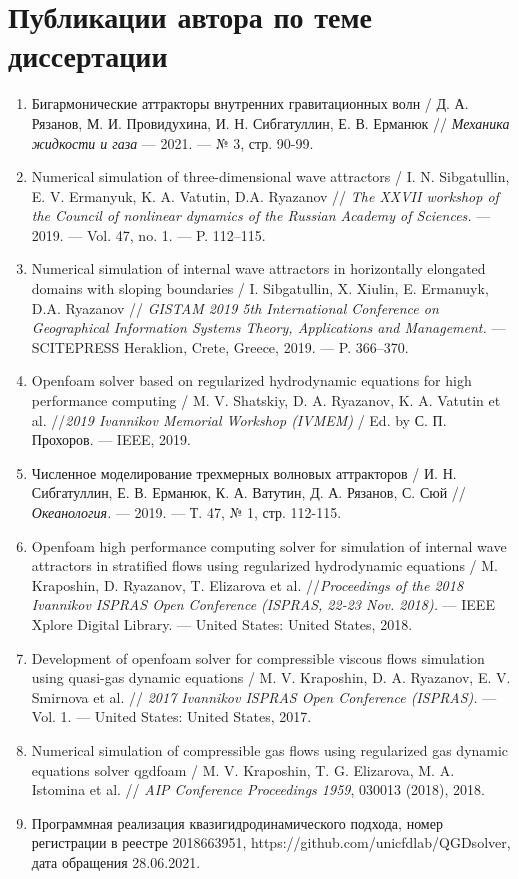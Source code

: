 \documentclass[utf8x]{G7-32} %
\newcommand\blfootnote[1]{%
  \begingroup
  \renewcommand\thefootnote{}\footnote{#1}%
  \addtocounter{footnote}{-1}%
  \endgroup
}
\begin{document}
\section*{Публикации автора по теме диссертации}
\footnotesize{
\begin{enumerate}[1.]
  \item Бигармонические аттракторы внутренних гравитационных волн / Д. А. Рязанов, М. И. Провидухина, И. Н. Сибгатуллин, Е. В. Ерманюк // \textit{Механика жидкости и газа}  — 2021. — № 3, стр. 90-99. 
  \item Numerical simulation of three-dimensional wave attractors / I. N. Sibgatullin, E. V. Ermanyuk, K. A. Vatutin, D.A. Ryazanov // \textit{The XXVII workshop of the Council of nonlinear dynamics of the Russian Academy of Sciences.} — 2019. — Vol. 47, no. 1. — P. 112–115.
  \item Numerical simulation of internal wave attractors in horizontally elongated domains with sloping boundaries / I. Sibgatullin, X. Xiulin, E. Ermanuyk, D.A. Ryazanov // \textit{GISTAM 2019 5th International Conference on Geographical Information Systems Theory, Applications and Management.} — SCITEPRESS Heraklion, Crete, Greece, 2019. — P. 366–370.
  \item Openfoam solver based on regularized hydrodynamic equations for high performance computing / M. V. Shatskiy, D. A. Ryazanov, K. A. Vatutin et al. //\textit{2019 Ivannikov Memorial Workshop (IVMEM)} / Ed. by С. П. Прохоров. — IEEE, 2019.
  \item  Численное моделирование трехмерных волновых аттракторов / И. Н. Сибгатуллин, Е. В. Ерманюк, К. А. Ватутин, Д. А. Рязанов, С. Сюй //\textit{Океанология.} — 2019. — Т. 47, № 1, стр. 112-115.
  \item Openfoam high performance computing solver for simulation of internal wave attractors in stratified flows using regularized hydrodynamic equations / M. Kraposhin, D. Ryazanov, T. Elizarova et al. //\textit{Proceedings of the 2018 Ivannikov ISPRAS Open Conference (ISPRAS, 22-23 Nov. 2018).} — IEEE Xplore Digital Library. — United States: United States, 2018.
  \item Development of openfoam solver for compressible viscous flows simulation using quasi-gas dynamic equations / M. V. Kraposhin, D. A. Ryazanov, E. V. Smirnova et al. // \textit{2017 Ivannikov ISPRAS Open Conference (ISPRAS).} — Vol. 1. — United States: United States, 2017.
  \item Numerical simulation of compressible gas flows using regularized gas dynamic equations solver qgdfoam / M. V. Kraposhin, T. G. Elizarova, M. A. Istomina et al. // \textit{AIP Conference Proceedings 1959}, 030013 (2018), 2018.
  \item Программная реализация квазигидродинамического подхода, номер регистрации в реестре 2018663951, https://github.com/unicfdlab/QGDsolver, дата обращения 28.06.2021.
\end{enumerate}
}

\end{document}
